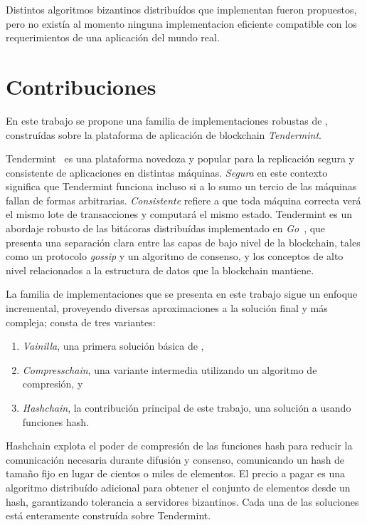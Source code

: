 %

Distintos algoritmos bizantinos distribuídos que implementan \setchain fueron
propuestos, pero no existía al momento ninguna implementacion eficiente compatible con
los requerimientos de una aplicación del mundo real.

\section{Contribuciones}
En este trabajo se propone una familia de implementaciones robustas de \setchain,
construídas sobre la plataforma de aplicación de blockchain \textit{Tendermint}.



Tendermint~\cite{Buchman.2018.Tendermint} es una plataforma novedoza y popular para la
replicación segura y consistente de aplicaciones en distintas máquinas.
%
\textit{Segura} en este contexto significa que Tendermint funciona incluso si a lo sumo
un tercio de las máquinas fallan de formas arbitrarias.
%
\textit{Consistente} refiere a que toda máquina correcta verá el mismo lote de
transacciones y computará el mismo estado.
%
Tendermint es un abordaje robusto de las bitácoras distribuídas implementado
en \emph{Go}~\cite{donovan15go}, que presenta una separación clara entre las
capas de bajo nivel de la blockchain,
tales como un protocolo \textit{gossip} y un algoritmo de consenso, y los conceptos de alto
nivel relacionados a la estructura de datos que la blockchain mantiene.

%
%

La familia de implementaciones que se presenta en este trabajo
sigue un enfoque incremental, proveyendo diversas aproximaciones
a la solución final y más compleja; consta de tres variantes:
\begin{enumerate}
  \item \textit{Vainilla}, una primera solución básica de \setchain,
  \item \textit{Compresschain}, una variante intermedia utilizando un algoritmo de compresión, y
  \item \textit{Hashchain}, la contribución principal de este trabajo, una solución 
  a \setchain usando funciones hash.
\end{enumerate}
%
Hashchain explota el poder de compresión de las funciones hash para reducir la
comunicación necesaria durante difusión y consenso, comunicando un hash de tamaño
fijo en lugar de cientos o miles de elementos.
%
El precio a pagar es una algoritmo distribuído adicional para obtener el conjunto de
elementos desde un hash, garantizando tolerancia a servidores bizantinos.
%
Cada una de las soluciones está enteramente construída sobre Tendermint.

